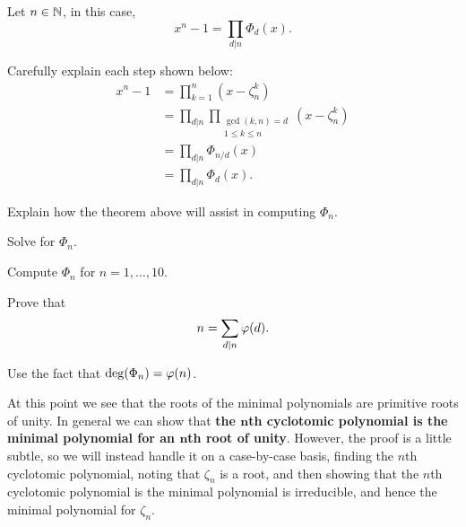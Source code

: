 \documentclass{ximera}
\begin{document}
\begin{theorem}
  Let $n\in \mathbb N$, in this case,
  \[
  x^n-1 = \prod_{d|n} \Phi_d(x).
  \]
  \begin{sketch}
    Carefully explain each step shown below:
    \begin{align*}
      x^n - 1 &= \prod_{k=1}^n (x-\zeta_n^k) \\
      &=\prod_{d|n}\prod_{\substack{\gcd(k,n) = d\\ 1\le k\le n}}(x-\zeta_n^k) \\
      &=\prod_{d|n} \Phi_{n/d}(x)\\
      &=\prod_{d|n} \Phi_d(x).
    \end{align*}
  \end{sketch}
\end{theorem}

\begin{exercise}
  Explain how the theorem above will assist in computing $\Phi_n$.
  \begin{hint}
    Solve for $\Phi_n$.
  \end{hint}
\end{exercise}


\begin{exercise}
  Compute $\Phi_n$ for $n = 1, \dots, 10$.
\end{exercise}

\begin{exercise}
  Prove that 
  \[
  n = \sum_{d|n} \eulerphi(d).
  \]
  \begin{hint}
    Use the fact that $\deg(\Phi_n) = \eulerphi(n)$.
  \end{hint}
\end{exercise}


At this point we see that the roots of the minimal polynomials are
primitive roots of unity. In general we can show that \textbf{the
  $\boldsymbol{n}$th cyclotomic polynomial is the minimal polynomial
  for an $\boldsymbol{n}$th root of unity}. However, the proof is a
little subtle, so we will instead handle it on a case-by-case basis,
finding the $n$th cyclotomic polynomial, noting that $\zeta_n$ is a
root, and then showing that the $n$th cyclotomic polynomial is the
minimal polynomial is irreducible, and hence the minimal polynomial
for $\zeta_n$.








  
\end{document}
